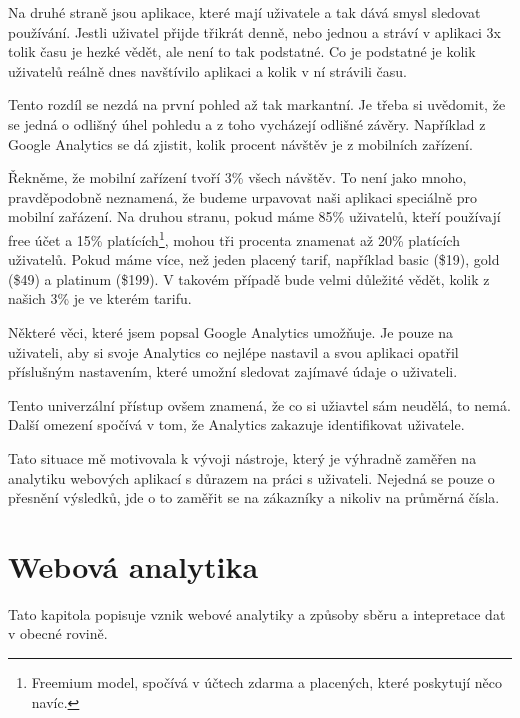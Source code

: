 \documentclass[bc,female,java,dept456]{diploma}						%
\begin{document}
Na druhé straně jsou aplikace, které mají uživatele a tak dává smysl sledovat používání. Jestli uživatel přijde třikrát denně, nebo jednou a stráví v aplikaci 3x tolik času je hezké vědět, ale není to tak podstatné. Co je podstatné je kolik uživatelů reálně dnes navštívilo aplikaci a kolik v ní strávili času.

Tento rozdíl se nezdá na první pohled až tak markantní. Je třeba si uvědomit, že se jedná o odlišný úhel pohledu a z toho vycházejí odlišné závěry. Například z Google Analytics se dá zjistit, kolik procent návštěv je z mobilních zařízení. 

Řekněme, že mobilní zařízení tvoří 3\% všech návštěv. To není jako mnoho, pravděpodobně neznamená, že budeme urpavovat naši aplikaci speciálně pro mobilní zařázení. Na druhou stranu, pokud máme 85\% uživatelů, kteří používají free účet a 15\% platících\footnote{Freemium model, spočívá v účtech zdarma a placených, které poskytují něco navíc.}, mohou tři procenta znamenat až 20\% platících uživatelů. Pokud máme více, než jeden placený tarif, například basic (\$19), gold (\$49) a platinum (\$199). V takovém případě bude velmi důležité vědět, kolik z našich 3\% je ve kterém tarifu.

\bigskip

Některé věci, které jsem popsal Google Analytics umožňuje. Je pouze na uživateli, aby si svoje Analytics co nejlépe nastavil a svou aplikaci opatřil příslušným nastavením, které umožní sledovat zajímavé údaje o uživateli.

Tento univerzální přístup ovšem znamená, že co si užiavtel sám neudělá, to nemá. Další omezení spočívá v tom, že Analytics zakazuje identifikovat uživatele.

Tato situace mě motivovala k vývoji nástroje, který je výhradně zaměřen na analytiku webových aplikací s důrazem na práci s uživateli. Nejedná se pouze o přesnění výsledků, jde o to zaměřit se na zákazníky a nikoliv na průměrná čísla.












\section{Webová analytika}

Tato kapitola popisuje vznik webové analytiky a způsoby sběru a intepretace dat v obecné rovině. 
\end{document}
